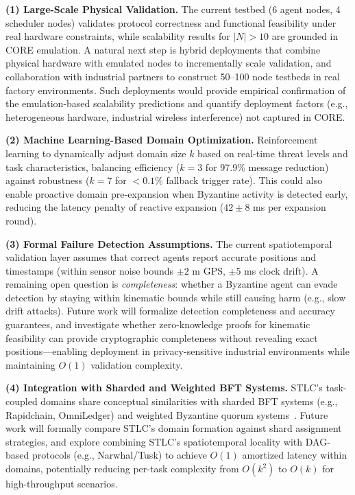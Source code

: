 \documentclass[manuscript,screen,review]{acmart}
\begin{document}
\textbf{(1) Large-Scale Physical Validation.} The current testbed (6 agent nodes, 4 scheduler nodes) validates protocol correctness and functional feasibility under real hardware constraints, while scalability results for $|N| > 10$ are grounded in CORE emulation. A natural next step is hybrid deployments that combine physical hardware with emulated nodes to incrementally scale validation, and collaboration with industrial partners to construct 50--100 node testbeds in real factory environments. Such deployments would provide empirical confirmation of the emulation-based scalability predictions and quantify deployment factors (e.g., heterogeneous hardware, industrial wireless interference) not captured in CORE.

\textbf{(2) Machine Learning-Based Domain Optimization.} Reinforcement learning to dynamically adjust domain size $k$ based on real-time threat levels and task characteristics, balancing efficiency ($k=3$ for 97.9\% message reduction) against robustness ($k=7$ for $<0.1\%$ fallback trigger rate). This could also enable proactive domain pre-expansion when Byzantine activity is detected early, reducing the latency penalty of reactive expansion ($42 \pm 8$ ms per expansion round).

\textbf{(3) Formal Failure Detection Assumptions.} The current spatiotemporal validation layer assumes that correct agents report accurate positions and timestamps (within sensor noise bounds $\pm 2$ m GPS, $\pm 5$ ms clock drift). A remaining open question is \textit{completeness}: whether a Byzantine agent can evade detection by staying within kinematic bounds while still causing harm (e.g., slow drift attacks). Future work will formalize detection completeness and accuracy guarantees, and investigate whether zero-knowledge proofs for kinematic feasibility can provide cryptographic completeness without revealing exact positions---enabling deployment in privacy-sensitive industrial environments while maintaining $O(1)$ validation complexity.

\textbf{(4) Integration with Sharded and Weighted BFT Systems.} STLC's task-coupled domains share conceptual similarities with sharded BFT systems (e.g., Rapidchain, OmniLedger) and weighted Byzantine quorum systems~\cite{malkhi1998byzantine}. Future work will formally compare STLC's domain formation against shard assignment strategies, and explore combining STLC's spatiotemporal locality with DAG-based protocols (e.g., Narwhal/Tusk) to achieve $O(1)$ amortized latency within domains, potentially reducing per-task complexity from $O(k^2)$ to $O(k)$ for high-throughput scenarios.
\end{document}

